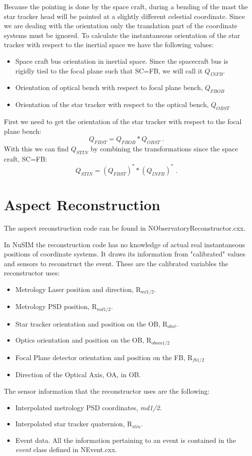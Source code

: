 Because the pointing is done by the space craft, during a bending of the mast the star tracker head will be pointed at a slightly different celestial coordinate. Since we are dealing with the orientation only the translation part of the coordinate systems must be ignored. To calculate the instantaneous orientation of the star tracker with respect to the inertial space we have the following values:
\begin{itemize}
\item Space craft bus orientation in inertial space. Since the spacecraft bus is rigidly tied to the focal plane such that SC=FB, we will call it $Q_{INFB}$.
\item Orientation of optical bench with respect to focal plane bench, $Q_{FBOB}$
\item Orientation of the star tracker with respect to the optical bench, $Q_{OBST}$
\end{itemize}

First we need to get the orientation of the star tracker with respect to the focal plane bench:
\begin{equation}
Q_{FBST} = Q_{FBOB}*Q_{OBST} \; .
\end{equation}
With this we can find $Q_{STIN}$ by combining the transformations since the space craft, SC=FB: 
\begin{equation}
Q_{STIN} = (Q_{FBST})^**(Q_{INFB})^* \; .
\end{equation}

\section{Aspect Reconstruction}
The aspect reconstruction code can be found in NObservatoryReconstructor.cxx.

In NuSIM the reconstruction code has no knowledge of actual real instantaneous positions of coordinate systems. It draws its information from "calibrated" values and sensors to reconstruct the event. These are the calibrated variables the reconstructor uses:
\begin{itemize}
\item Metrology Laser position and direction, R$_{ml1/2}$.
\item Metrology PSD position, R$_{md1/2}$.
\item Star tracker orientation and position on the OB, R$_{obst}$.
\item Optics orientation and position on the OB, R$_{obom1/2}$
\item Focal Plane detector orientation and position on the FB, R$_{fb1/2}$
\item Direction of the Optical Axis, OA, in OB.
\end{itemize}
The sensor information that the reconstructor uses are the following:
\begin{itemize}
\item Interpolated metrology PSD coordinates, \textit{md1/2}.
\item Interpolated star tracker quaternion, R$_{stin}$.
\item Event data. All the information pertaining to an event is contained in the \textit{event} class defined in NEvent.cxx.
\end{itemize}

